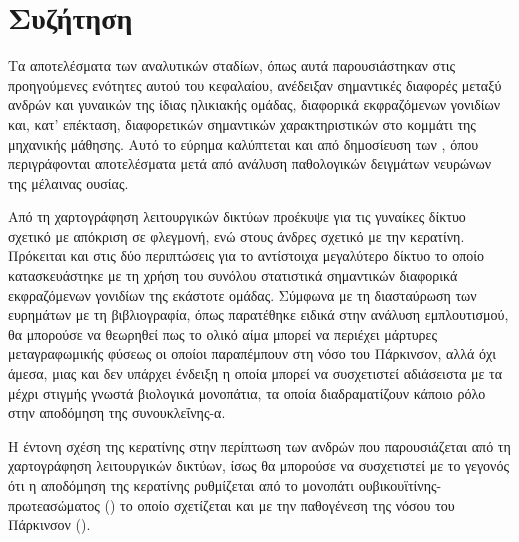 \documentclass[12pt]{report}
\begin{document}
        \section{Συζήτηση}
            Τα αποτελέσματα των αναλυτικών σταδίων, όπως αυτά παρουσιάστηκαν στις προηγούμενες ενότητες αυτού του κεφαλαίου, ανέδειξαν σημαντικές διαφορές μεταξύ ανδρών και γυναικών της ίδιας ηλικιακής ομάδας, διαφορικά εκφραζόμενων γονιδίων και, κατ' επέκταση, διαφορετικών σημαντικών χαρακτηριστικών στο κομμάτι της μηχανικής μάθησης. Αυτό το εύρημα καλύπτεται και από δημοσίευση των \cite{Simunovic2010EvidenceDisease}, όπου περιγράφονται αποτελέσματα μετά από ανάλυση παθολογικών δειγμάτων νευρώνων της μέλαινας ουσίας.
            \par
            Από τη χαρτογράφηση λειτουργικών δικτύων προέκυψε για τις γυναίκες δίκτυο σχετικό με απόκριση σε φλεγμονή, ενώ στους άνδρες σχετικό με την κερατίνη. Πρόκειται και στις δύο περιπτώσεις για το αντίστοιχα μεγαλύτερο δίκτυο το οποίο κατασκευάστηκε με τη χρήση του συνόλου στατιστικά σημαντικών διαφορικά εκφραζόμενων γονιδίων της εκάστοτε ομάδας. Σύμφωνα με τη διασταύρωση των ευρημάτων με τη βιβλιογραφία, όπως παρατέθηκε ειδικά στην ανάλυση εμπλουτισμού, θα μπορούσε να θεωρηθεί πως το ολικό αίμα μπορεί να περιέχει μάρτυρες μεταγραφωμικής φύσεως οι οποίοι παραπέμπουν στη νόσο του Πάρκινσον, αλλά όχι άμεσα, μιας και δεν υπάρχει ένδειξη η οποία μπορεί να συσχετιστεί αδιάσειστα με τα μέχρι στιγμής γνωστά βιολογικά μονοπάτια, τα οποία διαδραματίζουν κάποιο ρόλο στην αποδόμηση της συνουκλεΐνης-α. 
            \par
            Η έντονη σχέση της κερατίνης στην περίπτωση των ανδρών που παρουσιάζεται από τη χαρτογράφηση λειτουργικών δικτύων, ίσως θα μπορούσε να συσχετιστεί με το γεγονός ότι η αποδόμηση της κερατίνης ρυθμίζεται από το μονοπάτι ουβικουϊτίνης-πρωτεασώματος (\emph{\cite{Rogel2010TheDegradation}}) το οποίο σχετίζεται και με την παθογένεση της νόσου του Πάρκινσον (\emph{\cite{Lim2007RoleDisease}}).
\end{document}
